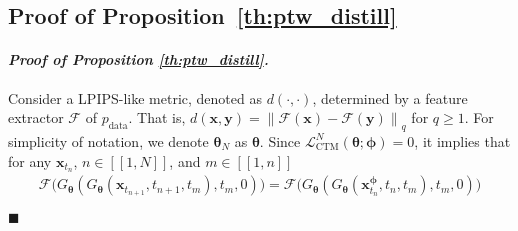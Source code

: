 \documentclass{article} \usepackage{iclr2024_coNFErence,times}
\newcommand{\norm}[1]{\left\lVert#1\right\rVert}
\newenvironment{myproof}[2]{\paragraph{\textit{Proof of {#1} {#2}. }}}{\hfill$\blacksquare$}
\theoremstyle{definition}
\theoremstyle{remark}
\begin{document}
\subsection{Proof of Proposition~\ref{th:ptw_distill}}


\begin{myproof}{Proposition}{\ref{th:ptw_distill}} Consider a LPIPS-like metric, denoted as $d(\cdot, \cdot)$, determined by a feature extractor $\mathcal{F}$ of $p_{\text{data}}$. That is, $d(\mathbf{x}, \mathbf{y})=\norm{\mathcal{F}(\mathbf{x})-\mathcal{F}(\mathbf{y})}_{q}$ for $q\geq1$. For simplicity of notation, we denote $\bm{\theta}_N$ as $\bm{\theta}$.
    Since $\mathcal{L}_{\text{CTM}}^{N}(\bm{\theta};\bm{\phi})=0$, it implies that for any $\mathbf{x}_{t_n}$, $n\in[\![ 1,N ]\!]$, and $m\in[\![ 1,n ]\!]$  
\begin{align}\label{eq:ctm_zero}
    \mathcal{F}\big( G_{\bm{\theta}}(G_{\bm{\theta}}(\mathbf{x}_{t_{n+1}},t_{n+1},t_m),t_m,0)\big) = \mathcal{F}\big( G_{\bm{\theta}}(G_{\bm{\theta}}(\mathbf{x}_{t_{n}}^{\bm{\phi}},t_{n},t_m),t_m,0)  \big)
\end{align}


\end{myproof}
\end{document}
